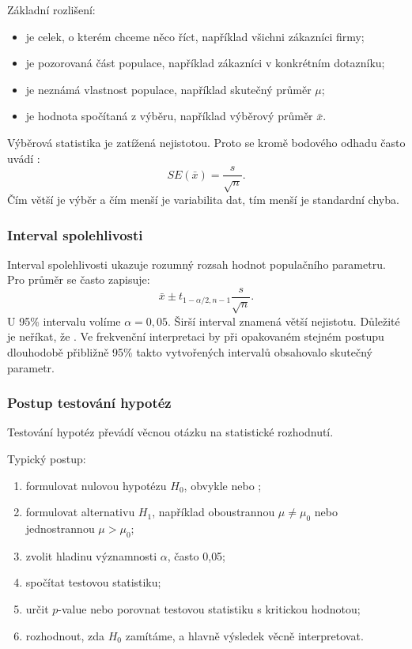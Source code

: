 Základní rozlišení:
\begin{itemize}
  \item {} je celek, o kterém chceme něco říct, například všichni zákazníci firmy;
  \item {} je pozorovaná část populace, například zákazníci v konkrétním dotazníku;
  \item {} je neznámá vlastnost populace, například skutečný průměr \(\mu\);
  \item {} je hodnota spočítaná z výběru, například výběrový průměr \(\bar{x}\).
\end{itemize}

Výběrová statistika je zatížená nejistotou. Proto se kromě bodového odhadu často uvádí
:
\[
  SE(\bar{x})=\frac{s}{\sqrt{n}}.
\]
Čím větší je výběr a čím menší je variabilita dat, tím menší je standardní chyba.

\subsubsection{Interval spolehlivosti}
Interval spolehlivosti ukazuje rozumný rozsah hodnot populačního parametru. Pro průměr se často zapisuje:
\[
  \bar{x}\pm t_{1-\alpha/2,n-1}\frac{s}{\sqrt{n}}.
\]
U 95\% intervalu volíme \(\alpha=0{,}05\). Širší interval znamená větší nejistotu. Důležité je neříkat,
že . Ve frekvenční interpretaci
by při opakovaném stejném postupu dlouhodobě přibližně 95\% takto vytvořených intervalů obsahovalo
skutečný parametr.

\subsubsection{Postup testování hypotéz}
Testování hypotéz převádí věcnou otázku na statistické rozhodnutí.

Typický postup:
\begin{enumerate}
  \item formulovat nulovou hypotézu \(H_0\), obvykle  nebo ;
  \item formulovat alternativu \(H_1\), například oboustrannou \( \mu \neq \mu_0 \) nebo jednostrannou
  \( \mu > \mu_0 \);
  \item zvolit hladinu významnosti \(\alpha\), často 0{,}05;
  \item spočítat testovou statistiku;
  \item určit \(p\)-value nebo porovnat testovou statistiku s kritickou hodnotou;
  \item rozhodnout, zda \(H_0\) zamítáme, a hlavně výsledek věcně interpretovat.
\end{enumerate}

